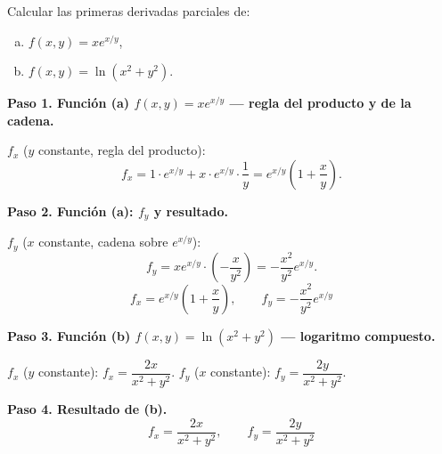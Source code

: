 \begin{example}
Calcular las primeras derivadas parciales de:
\begin{enumerate}[a)]
    \item $f(x,y)=x e^{x/y}$,
    \item $f(x,y)=\ln(x^2+y^2)$.
\end{enumerate}
\begin{myproof}
\textbf{Paso 1. Función (a) $f(x,y)=x e^{x/y}$ — regla del producto y de la cadena.}

$f_x$ ($y$ constante, regla del producto):
\[
f_x = 1\cdot e^{x/y} + x\cdot e^{x/y}\cdot \frac{1}{y}
= e^{x/y}\left(1+\frac{x}{y}\right).
\]

\textbf{Paso 2. Función (a): $f_y$ y resultado.}

$f_y$ ($x$ constante, cadena sobre $e^{x/y}$):
\[
f_y = x e^{x/y}\cdot \left(-\frac{x}{y^2}\right)
= -\frac{x^2}{y^2} e^{x/y}.
\]
\[
\boxed{f_x = e^{x/y}\!\left(1+\frac{x}{y}\right),\qquad
f_y = -\frac{x^2}{y^2}e^{x/y}}
\]

\textbf{Paso 3. Función (b) $f(x,y)=\ln(x^2+y^2)$ — logaritmo compuesto.}

$f_x$ ($y$ constante):
$f_x = \dfrac{2x}{x^2+y^2}$.
\quad
$f_y$ ($x$ constante):
$f_y = \dfrac{2y}{x^2+y^2}$.

\textbf{Paso 4. Resultado de (b).}
\[
\boxed{f_x = \frac{2x}{x^2+y^2},\qquad
f_y = \frac{2y}{x^2+y^2}}
\]
\end{myproof}
\end{example}

